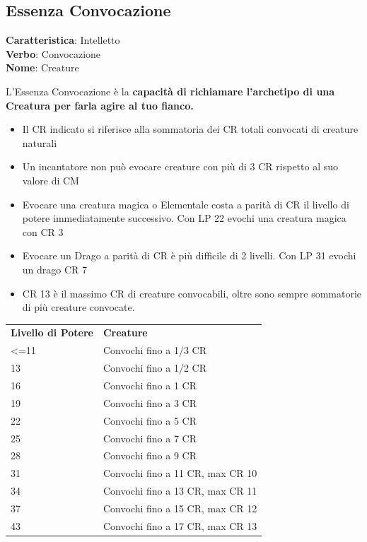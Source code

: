 \documentclass[a4paper,11pt,twoside,openany]{book}
\begin{document}
\pagebreak

\subsection{Essenza Convocazione}

\textbf{Caratteristica}: Intelletto\\
\textbf{Verbo}: Convocazione\\
\textbf{Nome}: Creature\\

\label{essenza-convocazione---intelletto}

L'Essenza Convocazione è la \textbf{capacità di richiamare l'archetipo di una Creatura per farla agire al tuo fianco.}
\begin{itemize}
	\item
      Il CR indicato si riferisce alla sommatoria dei CR totali convocati di creature naturali
	\item
      Un incantatore non può evocare creature con più di 3 CR rispetto al suo valore di CM
	\item
      Evocare una creatura magica o Elementale costa a parità di CR il livello di potere immediatamente successivo. Con LP 22 evochi una creatura magica con CR 3
	\item
      Evocare un Drago a parità di CR è più difficile di 2 livelli. Con LP 31 evochi un drago CR 7
	\item
      CR 13 è il massimo CR di creature convocabili, oltre sono sempre sommatorie di più creature convocate.
\end{itemize}

\bigskip

\begin{tabular}{ll}
	\toprule
	\textbf{Livello di Potere} & \textbf{Creature}\\
	\textless=11               & Convochi fino a 1/3 CR\\
	13                         & Convochi fino a 1/2 CR\\
	16                         & Convochi fino a 1 CR\\
	19                         & Convochi fino a 3 CR\\
	22                         & Convochi fino a 5 CR\\
	25                         & Convochi fino a 7 CR\\
	28                         & Convochi fino a 9 CR\\
	31                         & Convochi fino a 11 CR, max CR 10\\
	34                         & Convochi fino a 13 CR, max CR 11\\
	37                         & Convochi fino a 15 CR, max CR 12\\
	43                         & Convochi fino a 17 CR, max CR 13\\
\end{tabular}
\end{document}
